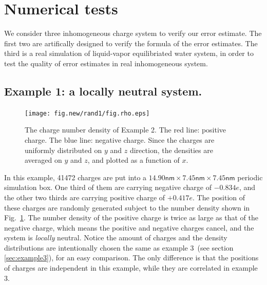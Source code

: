 \documentclass[aps,pre,preprint]{revtex4}
\begin{document}
\section{Numerical tests}\label{sec:tmp3}

We consider three inhomogeneous charge system to verify our error
estimate.
The first two are artifically designed to verify the formula of
the error estimates. The third is a real simulation
of liquid-vapor equilibriated water system, in order to test the
quality  of error estimates in real inhomogeneous system.  


\subsection{Example 1: a locally neutral system.}
\label{sec:example1}

\begin{figure}
  \centering
  \texttt{[image: fig.new/rand1/fig.rho.eps]}
  \caption{
    The charge number density  of Example 2.
    The red line: positive charge. The blue line: negative charge.
    Since the charges are uniformly distributed
    on $y$ and $z$ direction, the densities are averaged on $y$ and $z$,
    and plotted as a
    function of $x$.
  }
  \label{fig:tmp-rho1}
\end{figure}

In this example,  41472 charges are put into a
$14.90\textsf{nm}\times 7.45\textsf{nm}\times 7.45\textsf{nm}$
periodic simulation box. One third of
them are carrying negative charge of $-0.834e$, and the other two thirds
are carrying positive charge of $+0.417e$.
The position of these charges
are randomly generated subject to the number density shown in
Fig.~\ref{fig:tmp-rho1}.  The number density of the  positive
charge   is twice as large as that of the negative charge,
which means  the
positive and negative charges cancel, and the
system is \emph{locally} neutral. Notice the amount of charges
and the density distributions are intentionally chosen the same as
example 3~(see section \ref{sec:example3}), 
for an easy comparison.  The only difference is that the positions
of charges are independent  in this example,
while they are correlated in example 3.
\end{document}
